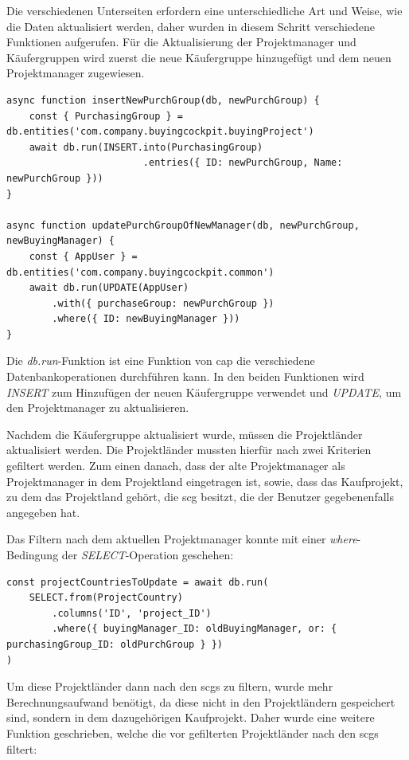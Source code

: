 Die verschiedenen Unterseiten erfordern eine unterschiedliche Art und Weise, wie die Daten aktualisiert werden, daher wurden in diesem Schritt verschiedene Funktionen aufgerufen.
Für die Aktualisierung der Projektmanager und Käufergruppen wird zuerst die neue Käufergruppe hinzugefügt und dem neuen Projektmanager zugewiesen.

\begin{lstlisting}[caption={Einfügen und Aktualisieren der Käufergruppe}]
async function insertNewPurchGroup(db, newPurchGroup) {
    const { PurchasingGroup } = db.entities('com.company.buyingcockpit.buyingProject')
    await db.run(INSERT.into(PurchasingGroup)
                        .entries({ ID: newPurchGroup, Name: newPurchGroup }))
}

async function updatePurchGroupOfNewManager(db, newPurchGroup, newBuyingManager) {
    const { AppUser } = db.entities('com.company.buyingcockpit.common')
    await db.run(UPDATE(AppUser)
        .with({ purchaseGroup: newPurchGroup })
        .where({ ID: newBuyingManager }))
}
\end{lstlisting}

Die \textit{db.run}-Funktion ist eine Funktion von \gls{cap} die verschiedene Datenbankoperationen durchführen kann.
In den beiden Funktionen wird \textit{INSERT} zum Hinzufügen der neuen Käufergruppe verwendet und \textit{UPDATE}, um den Projektmanager zu aktualisieren.

Nachdem die Käufergruppe aktualisiert wurde, müssen die Projektländer aktualisiert werden.
Die Projektländer mussten hierfür nach zwei Kriterien gefiltert werden.
Zum einen danach, dass der alte Projektmanager als Projektmanager in dem Projektland eingetragen ist, sowie, dass das Kaufprojekt, zu dem das Projektland gehört, die \gls{scg} besitzt, die der Benutzer gegebenenfalls angegeben hat.

Das Filtern nach dem aktuellen Projektmanager konnte mit einer \textit{where}-Bedingung der \textit{SELECT}-Operation geschehen:

\begin{lstlisting}[caption={SELECT-Operation für Projektländer}]
const projectCountriesToUpdate = await db.run(
    SELECT.from(ProjectCountry)
        .columns('ID', 'project_ID')
        .where({ buyingManager_ID: oldBuyingManager, or: { purchasingGroup_ID: oldPurchGroup } })
)
\end{lstlisting}

Um diese Projektländer dann nach den \glspl{scg} zu filtern, wurde mehr Berechnungsaufwand benötigt, da diese nicht in den Projektländern gespeichert sind, sondern in dem dazugehörigen Kaufprojekt.
Daher wurde eine weitere Funktion geschrieben, welche die vor gefilterten Projektländer nach den \glspl{scg} filtert:

